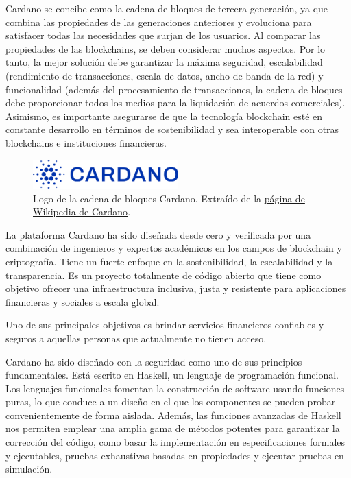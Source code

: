 \documentclass[12pt]{book}
\begin{document}
Cardano se concibe como la cadena de bloques de tercera generación, ya que combina las propiedades de las generaciones anteriores y evoluciona para satisfacer todas las necesidades que surjan de los usuarios. Al comparar las propiedades de las blockchains, se deben considerar muchos aspectos. Por lo tanto, la mejor solución debe garantizar la máxima seguridad, escalabilidad (rendimiento de transacciones, escala de datos, ancho de banda de la red) y funcionalidad (además del procesamiento de transacciones, la cadena de bloques debe proporcionar todos los medios para la liquidación de acuerdos comerciales). Asimismo, es importante asegurarse de que la tecnología blockchain esté en constante desarrollo en términos de sostenibilidad y sea interoperable con otras blockchains e instituciones financieras.

\begin{figure}[H]
	\centering
	\includegraphics[width=0.5\textwidth]{Cardano_logo.png}
    \caption[Logo de la cadena de bloques Cardano.]{Logo de la cadena de bloques Cardano. Extraído de la \href{https://en.wikipedia.org/wiki/Cardano_(blockchain_platform)}{página de Wikipedia de Cardano}.}\label{fig:Cardano_logo}
\end{figure}


La plataforma Cardano ha sido diseñada desde cero y verificada por una combinación de ingenieros y expertos académicos en los campos de blockchain y criptografía.
Tiene un fuerte enfoque en la sostenibilidad, la escalabilidad y la transparencia.
Es un proyecto totalmente de código abierto que tiene como objetivo ofrecer una infraestructura inclusiva, justa y resistente para aplicaciones financieras y sociales a escala global.

Uno de sus principales objetivos es brindar servicios financieros confiables y seguros a aquellas personas que actualmente no tienen acceso.

Cardano ha sido diseñado con la seguridad como uno de sus principios fundamentales. Está escrito en Haskell, un lenguaje de programación funcional. Los lenguajes funcionales fomentan la construcción de software usando funciones puras, lo que conduce a un diseño en el que los componentes se pueden probar convenientemente de forma aislada. Además, las funciones avanzadas de Haskell nos permiten emplear una amplia gama de métodos potentes para garantizar la corrección del código, como basar la implementación en especificaciones formales y ejecutables, pruebas exhaustivas basadas en propiedades y ejecutar pruebas en simulación.
\end{document}
